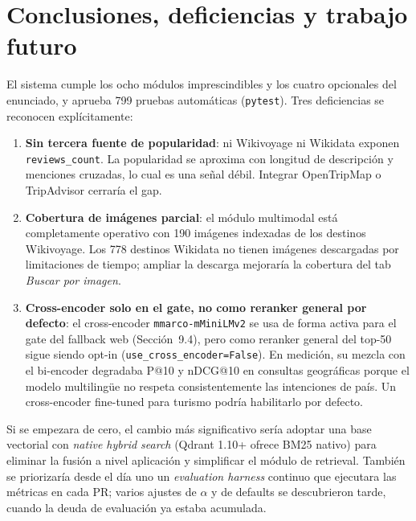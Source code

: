 \documentclass[runningheads,a4paper]{llncs}
\begin{document}
\section{Conclusiones, deficiencias y trabajo futuro}

El sistema cumple los ocho m\'odulos imprescindibles y los cuatro opcionales del enunciado, y aprueba 799 pruebas autom\'aticas (\texttt{pytest}). Tres deficiencias se reconocen expl\'icitamente:

\begin{enumerate}
\item \textbf{Sin tercera fuente de popularidad}: ni Wikivoyage ni Wikidata exponen \texttt{reviews\_count}. La popularidad se aproxima con longitud de descripci\'on y menciones cruzadas, lo cual es una se\~nal d\'ebil. Integrar OpenTripMap o TripAdvisor cerrar\'ia el gap.
\item \textbf{Cobertura de im\'agenes parcial}: el m\'odulo multimodal est\'a completamente operativo con 190 im\'agenes indexadas de los destinos Wikivoyage. Los 778 destinos Wikidata no tienen im\'agenes descargadas por limitaciones de tiempo; ampliar la descarga mejorar\'ia la cobertura del tab \emph{Buscar por imagen}.
\item \textbf{Cross-encoder solo en el gate, no como reranker general por defecto}: el cross-encoder \texttt{mmarco-mMiniLMv2} se usa de forma activa para el gate del fallback web (Secci\'on~9.4), pero como reranker general del top-50 sigue siendo opt-in (\texttt{use\_cross\_encoder=False}). En medici\'on, su mezcla con el bi-encoder degradaba P@10 y nDCG@10 en consultas geogr\'aficas porque el modelo multilingüe no respeta consistentemente las intenciones de pa\'is. Un cross-encoder fine-tuned para turismo podr\'ia habilitarlo por defecto.
\end{enumerate}

Si se empezara de cero, el cambio m\'as significativo ser\'ia adoptar una base vectorial con \emph{native hybrid search} (Qdrant 1.10+ ofrece BM25 nativo) para eliminar la fusi\'on a nivel aplicaci\'on y simplificar el m\'odulo de retrieval. Tambi\'en se priorizar\'ia desde el d\'ia uno un \emph{evaluation harness} continuo que ejecutara las m\'etricas en cada PR; varios ajustes de $\alpha$ y de defaults se descubrieron tarde, cuando la deuda de evaluaci\'on ya estaba acumulada.
\end{document}
